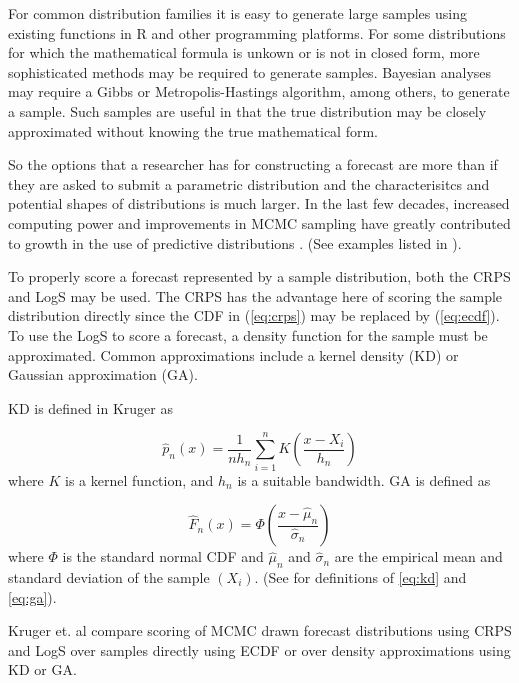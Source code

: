 \documentclass{article}\usepackage[]{graphicx}\usepackage[]{color}
\begin{document}
For common distribution families it is easy to generate large samples using 
existing functions in R and other programming platforms. For some distributions 
for which the mathematical formula is unkown or is not in closed form, more 
sophisticated methods may be required to generate samples. Bayesian analyses may 
require a Gibbs or Metropolis-Hastings algorithm, among others, to generate a 
sample. Such samples are useful in that the true distribution may be closely 
approximated without knowing the true mathematical form. 

So the options that a researcher has for constructing a forecast are more than
if they are asked to submit a parametric distribution and the characterisitcs 
and potential shapes of distributions is much larger.
In the last few decades, increased computing power and improvements in MCMC
sampling have greatly contributed to growth in the use of
predictive distributions \cite{gneiting2007strictly}. (See examples listed in
\cite{krueger2016probabilistic}).

To properly score a forecast represented by a sample distribution, both the CRPS
and LogS may be used. The CRPS has the advantage here of scoring the sample 
distribution directly since the CDF in  (\ref{eq:crps}) may be replaced by 
(\ref{eq:ecdf}). To use the LogS to score a forecast, a density function for the 
sample must be approximated. Common approximations include a kernel density (KD)
or Gaussian approximation (GA).

KD is defined in Kruger as

\begin{equation}
\label{eq:kd}
  \hat{p}_n(x) = \frac{1}{n h_n} \sum_{i=1}^n K \left( \frac{x-X_i}{h_n} \right) 
\end{equation}
where $K$ is a kernel function, and $h_n$ is a suitable bandwidth. GA is defined
as 

\begin{equation}
\label{eq:ga}
  \hat{F}_n(x) = \Phi  \left( \frac{x-\hat{\mu}_n}{\hat{\sigma}_n} \right)
\end{equation}
where $\Phi$ is the standard normal CDF and $\hat{\mu}_n$ and $\hat{\sigma}_n$
are the empirical mean and standard deviation of the sample $(X_i)$. (See
\cite{krueger2016probabilistic} for definitions of \ref{eq:kd} and \ref{eq:ga}).

Kruger et. al compare scoring of MCMC drawn forecast distributions using CRPS 
and LogS over samples directly using ECDF or over density approximations using
KD or GA.
\end{document}
